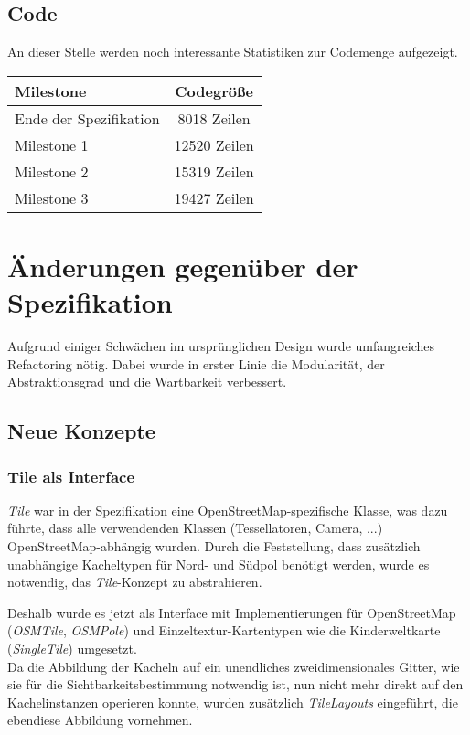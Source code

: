 \documentclass[10pt]{scrreprt}
\begin{document}
\vspace*{8mm}
\section{Code}
An dieser Stelle werden noch interessante Statistiken zur Codemenge aufgezeigt.

{\sffamily

\vspace*{2mm}

\begin{tabular}{|l|c|}
\textbf{Milestone} & \textbf{Codegröße}\\
\hline
Ende der Spezifikation & 8018 Zeilen \\
Milestone 1 & 12520 Zeilen\\
Milestone 2 & 15319 Zeilen\\
Milestone 3 & 19427 Zeilen\\
\end{tabular}

}

\chapter{Änderungen gegenüber der Spezifikation}

Aufgrund einiger Schwächen im ursprünglichen Design wurde umfangreiches Refactoring nötig. Dabei wurde in erster Linie die Modularität, der Abstraktionsgrad und die Wartbarkeit verbessert.

\section{Neue Konzepte}
\subsection*{Tile als Interface}
\textit{Tile} war in der Spezifikation eine OpenStreetMap-spezifische Klasse, was dazu führte, dass alle verwendenden Klassen (Tessellatoren, Camera, ...) OpenStreetMap-abhängig wurden. Durch die Feststellung, dass zusätzlich unabhängige Kacheltypen für Nord- und Südpol benötigt werden, wurde es notwendig, das \textit{Tile}-Konzept zu abstrahieren.

Deshalb wurde es jetzt als Interface mit Implementierungen für OpenStreetMap (\textit{OSMTile}, \textit{OSMPole}) und Einzeltextur-Kartentypen wie die Kinderweltkarte (\textit{SingleTile}) umgesetzt.\\[5mm]
Da die Abbildung der Kacheln auf ein unendliches zweidimensionales Gitter, wie sie für die Sichtbarkeitsbestimmung notwendig ist, nun nicht mehr direkt auf den Kachelinstanzen operieren konnte, wurden zusätzlich \textit{TileLayouts} eingeführt, die ebendiese Abbildung vornehmen.
\end{document}
